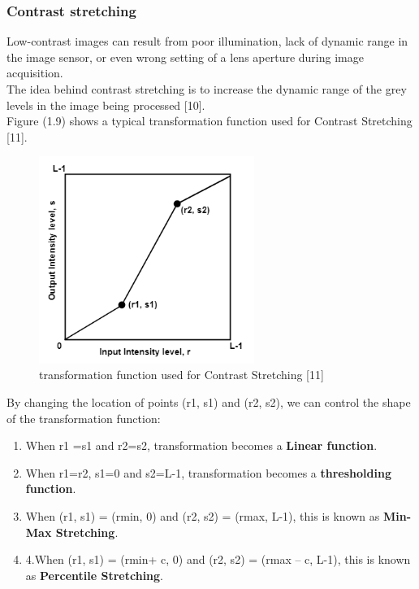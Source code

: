 \subsubsection{Contrast stretching}
Low-contrast images can result from poor illumination, lack of dynamic range in the image sensor,
or even wrong setting of a lens aperture during image acquisition.\\
The idea behind contrast stretching is to increase the dynamic range of the grey levels in the image being processed [10].\\
Figure (1.9) shows a typical transformation function used for Contrast Stretching [11].

        \begin{figure}[h]
                \centering
                \includegraphics[width=7cm]{chapiter1/figures/linear_Transform.png}
                \setlength{\fboxrule}{2pt}
                \caption{transformation function used for Contrast Stretching [11]}
        \end{figure}

By changing the location of points (r1, s1) and (r2, s2), we can control the shape of the transformation function:
        \begin{enumerate}
                \item When r1 =s1 and r2=s2, transformation becomes a \textbf{Linear function}.
                \item When r1=r2, s1=0 and s2=L-1, transformation becomes a \textbf{thresholding function}.
                \item When (r1, s1) = (rmin, 0) and (r2, s2) = (rmax, L-1), this is known as \textbf{Min-Max Stretching}.
                \item 4.When (r1, s1) = (rmin+ c, 0) and (r2, s2) = (rmax – c, L-1), this is known as \textbf{Percentile Stretching}.
        \end{enumerate}

